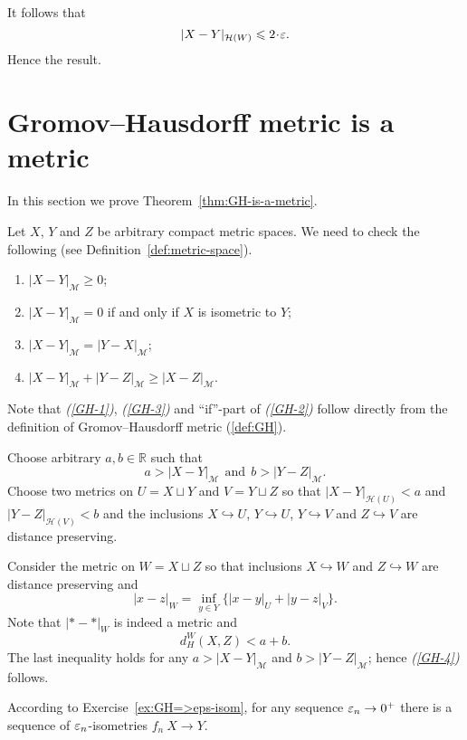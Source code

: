 It follows that $$|X-Y|_{\mathcal{H}(W)}\le 2\cdot\eps.$$
Hence the result.
\qedsf

\section{Gromov--Hausdorff metric is a metric}

In this section we prove  Theorem~\ref{thm:GH-is-a-metric}.


Let $X$, $Y$ and $Z$ be arbitrary  compact metric spaces.
We need to check the following (see Definition~\ref{def:metric-space}).
\begin{enumerate}[{\it (i)}]
\item\label{GH-1} $|X-Y|_{\mathcal{M}}\ge 0$;
\item\label{GH-2} $|X-Y|_{\mathcal{M}}=0$ if and only if $X$ is isometric to $Y$;
\item\label{GH-3} $|X-Y|_{\mathcal{M}}=|Y-X|_{\mathcal{M}}$;
\item\label{GH-4} $|X-Y|_{\mathcal{M}}+|Y-Z|_{\mathcal{M}}\ge |X-Z|_{\mathcal{M}}$.
\end{enumerate}


Note that {\it (\ref{GH-1})}, {\it(\ref{GH-3})} and ``if''-part of {\it(\ref{GH-2})} follow directly from the definition of Gromov--Hausdorff metric (\ref{def:GH}).

Choose arbitrary $a,b \in \mathbb{R}$ such that
$$a>|X-Y|_{\mathcal{M}}\ \ \text{and}\ \  b>|Y-Z|_{\mathcal{M}}.$$
Choose two metrics on $U=X\sqcup Y$ and $V=Y\sqcup Z$ so that
$|X-Y|_{\mathcal{H}(U)}<a$ and $|Y-Z|_{\mathcal{H}(V)}<b$ 
and the inclusions $X\hookrightarrow U$, $Y\hookrightarrow U$, $Y\hookrightarrow V$ and $Z\hookrightarrow V$ are distance preserving.

Consider the metric on $W=X\sqcup Z$ 
so that inclusions $X\hookrightarrow W$ and $Z\hookrightarrow W$ are distance preserving
and 
$$|x-z|_W=\inf_{y\in Y}\{|x-y|_U+|y-z|_V\}.$$
Note that $|{*}-{*}|_W$ is indeed a metric and 
$$d^W_H(X,Z)<a+b.$$
The last inequality holds for any $a>|X-Y|_{\mathcal{M}}$ and $b>|Y-Z|_{\mathcal{M}}$;
hence {\it (\ref{GH-4})} follows.
\qeds

According to Exercise~\ref{ex:GH=>eps-isom},
for any sequence $\varepsilon_n\to0^+$ there is a sequence of $\varepsilon_n$-isometries 
$f_n\:X\to Y$.

